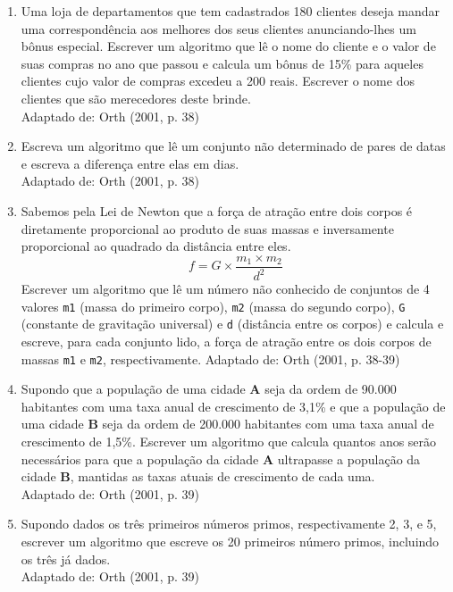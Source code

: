 \documentclass[onecolumn,a4paper,10pt]{report}
\newcommand{\+}{\, + \,}
\newcommand{\<}{\hspace*{-0.4cm}}
\begin{document}
\begin{enumerate}[1.]
\item Uma loja de departamentos que tem cadastrados 180 clientes deseja mandar uma correspondência aos melhores dos seus clientes anunciando-lhes um bônus especial. Escrever um algoritmo que lê o nome do cliente e o valor de suas compras no ano que passou e calcula um bônus de 15\% para aqueles clientes cujo valor de compras excedeu a 200 reais. Escrever o nome dos clientes que são merecedores deste brinde.\\
{\tiny Adaptado de: Orth (2001, p. 38)}

\item Escreva um algoritmo que lê um conjunto não determinado de pares de datas e escreva a diferença entre elas em dias.\\
{\tiny Adaptado de: Orth (2001, p. 38)}

\item Sabemos pela Lei de Newton que a força de atração entre dois corpos é diretamente proporcional ao produto de suas massas e inversamente proporcional ao quadrado da distância entre eles.
\[f = G \times \frac{m_1 \times m_2}{d^2}\]
Escrever um algoritmo que lê um número não conhecido de conjuntos de 4 valores \texttt{m1} (massa do primeiro corpo), \texttt{m2} (massa do segundo corpo), \texttt{G} (constante de gravitação universal) e \texttt{d} (distância entre os corpos) e calcula e escreve, para cada conjunto lido, a força de atração entre os dois corpos de massas \texttt{m1} e \texttt{m2}, respectivamente.
{\tiny Adaptado de: Orth (2001, p. 38-39)}

\item Supondo que a população de uma cidade \textbf{A} seja da ordem de 90.000 habitantes com uma taxa anual de crescimento de 3,1\% e que a população de uma cidade \textbf{B} seja da ordem de 200.000 habitantes com uma taxa anual de crescimento de 1,5\%. Escrever um algoritmo que calcula quantos anos serão necessários para que a população da cidade \textbf{A} ultrapasse a população da cidade \textbf{B}, mantidas as taxas atuais de crescimento de cada uma.\\
{\tiny Adaptado de: Orth (2001, p. 39)}

\item Supondo dados os três primeiros números primos, respectivamente 2, 3, e 5, escrever um algoritmo que escreve os 20 primeiros número primos, incluindo os três já dados.\\
{\tiny Adaptado de: Orth (2001, p. 39)}

\end{enumerate}

~\\

\end{document}
